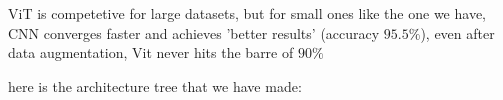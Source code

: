









ViT is competetive for large datasets, but for small ones like the one we have, CNN converges faster and achieves 'better results' (accuracy $95.5\%$), even after data augmentation, Vit never hits the barre of $90\%$

here is the architecture tree that we have made:





